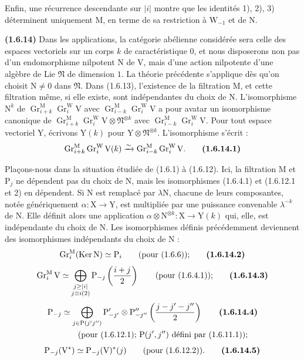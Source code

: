 \documentclass[11pt,leqno]{article}
\newcommand{\Page}[1]{\ifvmode\noindent\else\unskip\ \fi{\footnotesize\textcolor{gray}{[p.\,#1]}}\ \ignorespaces}
\begin{document}
Enfin, une récurrence descendante sur \(|i|\) montre que les identités 1), 2), 3) déterminent uniquement \(\mathrm{M}\), en terme de sa restriction à \(\mathrm{W}_{-1}\) et de \(\mathrm{N}\).

\textbf{(1.6.14)} Dans les applications, la catégorie abélienne considérée sera celle des espaces vectoriels sur un corps \(k\) de caractéristique \(0\), et nous disposerons non pas d’un endomorphisme nilpotent \(\mathrm{N}\) de \(\mathrm{V}\), mais d’une action nilpotente d’une algèbre de Lie \(\mathfrak{N}\) de dimension \(1\). La théorie précédente s’applique dès qu’on choisit \(\mathrm{N}\neq0\) dans \(\mathfrak{N}\). Dans (1.6.13), l’existence de la filtration \(\mathrm{M}\), et cette filtration même, si elle existe, sont indépendantes du choix de \(\mathrm{N}\). L’isomorphisme \(\mathrm{N}^k\) de \(\operatorname{Gr}_{i+k}^{\mathrm{M}}\operatorname{Gr}_i^{\mathrm{W}}\mathrm{V}\) avec \(\operatorname{Gr}_{i-k}^{\mathrm{M}}\operatorname{Gr}_i^{\mathrm{W}}\mathrm{V}\) a pour avatar un isomorphisme canonique de \(\operatorname{Gr}_{i+k}^{\mathrm{M}}\operatorname{Gr}_i^{\mathrm{W}}\mathrm{V}\otimes\mathfrak{N}^{\otimes k}\) avec \(\operatorname{Gr}_{i-k}^{\mathrm{M}}\operatorname{Gr}_i^{\mathrm{W}}\mathrm{V}\). Pour tout espace vectoriel \(\mathrm{Y}\), écrivons \(\mathrm{Y}(k)\) pour \(\mathrm{Y}\otimes\mathfrak{N}^{\otimes k}\). L’isomorphisme s’écrit :
\[
\operatorname{Gr}_{i+k}^{\mathrm{M}}\operatorname{Gr}_i^{\mathrm{W}}\mathrm{V}(k)
\xrightarrow{\sim}
\operatorname{Gr}_{i-k}^{\mathrm{M}}\operatorname{Gr}_i^{\mathrm{W}}\mathrm{V}.
\tag*{\textbf{(1.6.14.1)}}
\]

Plaçons-nous dans la situation étudiée de (1.6.1) à (1.6.12). Ici, la filtration \(\mathrm{M}\) et \(\mathrm{P}_j\) ne dépendent pas du choix de \(\mathrm{N}\), mais les isomorphismes (1.6.4.1) et (1.6.12.1 et 2) en dépendent. Si \(\mathrm{N}\) est remplacé par \(\lambda\mathrm{N}\), chacune de leurs composantes, notée génériquement \(\alpha:\mathrm{X}\to\mathrm{Y}\), est multipliée par une puissance convenable \(\lambda^{-k}\) de \(\mathrm{N}\). Elle définit alors une application \(\alpha\otimes\mathrm{N}^{\otimes k}:\mathrm{X}\to\mathrm{Y}(k)\) qui, elle, est indépendante du choix de \(\mathrm{N}\). Les isomorphismes définis précédemment deviennent des isomorphismes indépendants du choix de \(\mathrm{N}\) :
\Page{170}
\[
\operatorname{Gr}_i^{\mathrm{M}}(\operatorname{Ker}\mathrm{N})
\simeq\mathrm{P}_i
\qquad\text{(pour (1.6.6));}
\tag*{\textbf{(1.6.14.2)}}
\]
\[
\operatorname{Gr}_i^{\mathrm{M}}\mathrm{V}
\simeq
\bigoplus_{\substack{j\geq|i|\\j\equiv i(2)}}
\mathrm{P}_{-j}\left(\frac{i+j}{2}\right)
\qquad\text{(pour (1.6.4.1));}
\tag*{\textbf{(1.6.14.3)}}
\]
\begin{align*}
\mathrm{P}_{-j}
&\simeq
\bigoplus_{j\in\mathrm{P}(j'j'')}
\mathrm{P}'_{-j'}\otimes\mathrm{P}''_{-j''}
\left(\frac{j-j'-j''}{2}\right)
\tag*{\textbf{(1.6.14.4)}}\\
&\qquad\text{(pour (1.6.12.1); }\mathrm{P}(j',j'')
\text{ défini par (1.6.11.1));}
\end{align*}
\[
\mathrm{P}_{-j}(\mathrm{V}^*)
\simeq\mathrm{P}_{-j}(\mathrm{V})^*(j)
\qquad\text{(pour (1.6.12.2)).}
\tag*{\textbf{(1.6.14.5)}}
\]
\end{document}
